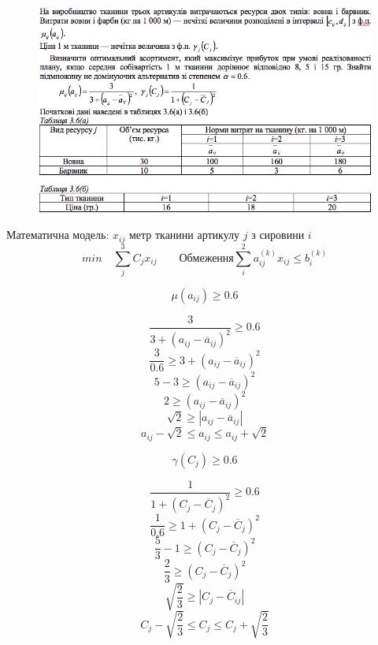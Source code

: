 \begin{center}
  \normalsize{}
\end{center}


\begin{figure}[h!]
  \centering
  \includegraphics[width=13.8cm]{3_6.png}
  \centering
\end{figure}


Математична модель: $x_{ij}$ метр тканини артикулу $j$ з сировини $i$
$$
min \quad   \sum_j^3 C_{j} x_{ij} \qquad  \text{Обмеження} \sum_i^2 a_{ij}^{(k)} x_{ij} \leqslant b_i^{(k)}
$$


\begin{multicols}{2}
  $$\mu(a_{ij}) \geqslant 0.6  $$

  $$ \dfrac{3}{3+(a_{ij}-\overline{a}_{ij})^2} \geqslant 0.6 $$
  $$ \dfrac{3}{0.6} \geqslant 3+(a_{ij}-\overline{a}_{ij})^2 $$
  $$ 5-3 \geqslant (a_{ij}-\overline{a}_{ij})^2 $$
  $$ 2 \geqslant (a_{ij}-\overline{a}_{ij})^2 $$
  $$ \sqrt{2} \geqslant |a_{ij}-\overline{a}_{ij}|  $$
  $$ a_{ij} - \sqrt{2} \leqslant a_{ij} \leqslant a_{ij} + \sqrt{2}  $$

  \columnbreak
  $$\gamma(C_{j}) \geqslant 0.6 $$

  $$ \dfrac{1}{1+(C_{j}-\overline{C}_{j})^2} \geqslant 0.6 $$
  $$ \dfrac{1}{0.6} \geqslant 1+(C_{j}-\overline{C}_{j})^2 $$
  $$ \dfrac{5}{3} - 1 \geqslant (C_{j}-\overline{C}_{j})^2 $$
  $$ \dfrac{2}{3} \geqslant (C_{j}-\overline{C}_{j})^2 $$
  $$ \sqrt{\dfrac{2}{3}} \geqslant |C_{j}-\overline{C}_{ij}| $$
  $$ C_{j}-\sqrt{\dfrac{2}{3}} \leqslant C_{j} \leqslant C_{j}+\sqrt{\dfrac{2}{3}}  $$

\end{multicols}

\begin{multicols}{2}



  \columnbreak



\end{multicols}
